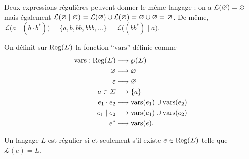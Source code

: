 \begin{exm}
	Deux expressions régulières peuvent donner le même langage :
	on a $\mathcal{L}(\varnothing) = \varnothing$\/ mais également $\mathcal{L}(\varnothing \mid \varnothing) = \mathcal{L}(\varnothing) \cup \mathcal{L}(\varnothing) = \varnothing \cup \varnothing = \varnothing$.
	De même, $\mathcal{L}\big(a \mid (b\cdot b^*)\big) = \{a, b, bb, bbb, \ldots\} = \mathcal{L}\big((bb^*) \mid a\big)$.
\end{exm}

\begin{defn}
	On définit sur $\operatorname{Reg}(\varSigma)$\/ la fonction ``$\mathrm{vars}$\/'' définie comme
	\begin{align*}
		\mathrm{vars}: \operatorname{Reg}(\varSigma) &\longrightarrow \wp(\varSigma) \\
		\varnothing &\longmapsto \varnothing\\
		\varepsilon &\longmapsto \varnothing\\
		a \in \varSigma &\longmapsto \{a\}\\
		e_1\cdot e_2 &\longmapsto \mathrm{vars}(e_1) \cup \mathrm{vars}(e_2)\\
		e_1 \mid e_2 &\longmapsto \mathrm{vars}(e_1) \cup \mathrm{vars}(e_2)\\
		e^* &\longmapsto \mathrm{vars}(e).
	\end{align*}
\end{defn}

\begin{prop}
	Un langage $L$\/ est régulier si et seulement s'il existe $e \in \operatorname{Reg}(\varSigma)$\/ telle que $\mathcal{L}(e) = L$.
\end{prop}

